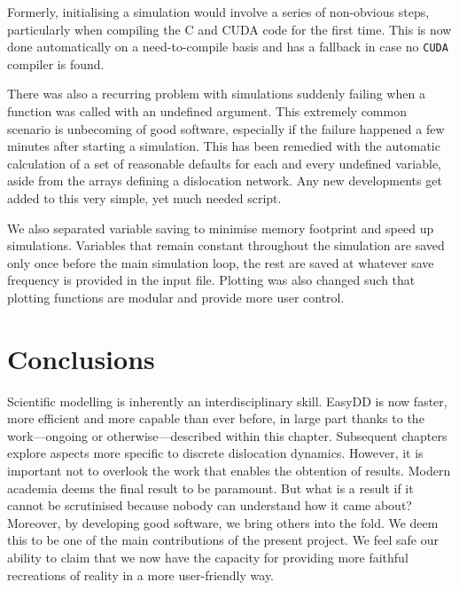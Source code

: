Formerly, initialising a simulation would involve a series of non-obvious steps, particularly when compiling the C and CUDA code for the first time. This is now done automatically on a need-to-compile basis and has a fallback in case no \texttt{CUDA} compiler is found.

There was also a recurring problem with simulations suddenly failing when a function was called with an undefined argument. This extremely common scenario is unbecoming of good software, especially if the failure happened a few minutes after starting a simulation. This has been remedied with the automatic calculation of a set of reasonable defaults for each and every undefined variable, aside from the arrays defining a dislocation network. Any new developments get added to this very simple, yet much needed script.

We also separated variable saving to minimise memory footprint and speed up simulations. Variables that remain constant throughout the simulation are saved only once before the main simulation loop, the rest are saved at whatever save frequency is provided in the input file. Plotting was also changed such that plotting functions are modular and provide more user control.

\section{Conclusions}

Scientific modelling is inherently an interdisciplinary skill. EasyDD is now faster, more efficient and more capable than ever before, in large part thanks to the work---ongoing or otherwise---described within this chapter. Subsequent chapters explore aspects more specific to discrete dislocation dynamics. However, it is important not to overlook the work that enables the obtention of results. Modern academia deems the final result to be paramount. But what is a result if it cannot be scrutinised because nobody can understand how it came about? Moreover, by developing good software, we bring others into the fold. We deem this to be one of the main contributions of the present project. We feel safe our ability to claim that we now have the capacity for providing more faithful recreations of reality in a more user-friendly way.
\savearabiccounter
